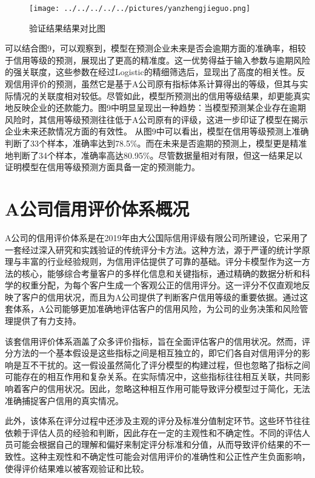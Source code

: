 \begin{figure}
	\centering
	\texttt{[image: ../../../../../pictures/yanzhengjieguo.png]}
	\caption{验证结果结果对比图}
\end{figure}
可以结合图9，可以观察到，模型在预测企业未来是否会逾期方面的准确率，相较于信用等级的预测，展现出了更高的精准度。这一优势得益于输入参数与逾期风险的强关联度，这些参数在经过Logistic的精细筛选后，显现出了高度的相关性。反观信用评价的预测，虽然它是基于A公司原有指标体系计算得出的等级，但其与实际情况的关联度相对较低。尽管如此，模型所预测出的信用等级结果，却更能真实地反映企业的还款能力。图9中明显呈现出一种趋势：当模型预测某企业存在逾期风险时，其信用等级预测往往低于A公司原有的评级，这进一步印证了模型在揭示企业未来还款情况方面的有效性。
从图9中可以看出，模型在信用等级预测上准确判断了33个样本，准确率达到78.5\%。而在未来是否逾期的预测上，模型更是精准地判断了34个样本，准确率高达80.95\%。尽管数据量相对有限，但这一结果足以证明模型在信用等级预测方面具备一定的预测能力。



\iffalse
\section{A公司信用评价体系概况}

A公司的信用评价体系是在2019年由大公国际信用评级有限公司所建设，它采用了一套经过深入研究和实践验证的传统评分卡方法。这种方法，源于严谨的统计学原理与丰富的行业经验规则，为信用评估提供了可靠的基础。评分卡模型作为这一方法的核心，能够综合考量客户的多样化信息和关键指标，通过精确的数据分析和科学的权重分配，为每个客户生成一个客观公正的信用评分。这一评分不仅直观地反映了客户的信用状况，而且为A公司提供了判断客户信用等级的重要依据。通过这套体系，A公司能够更加准确地评估客户的信用风险，为公司的业务决策和风险管理提供了有力支持。

该套信用评价体系涵盖了众多评价指标，旨在全面评估客户的信用状况。然而，评分方法的一个基本假设是这些指标之间是相互独立的，即它们各自对信用评分的影响是互不干扰的。这一假设虽然简化了评分模型的构建过程，但也忽略了指标之间可能存在的相互作用和复杂关系。在实际情况中，这些指标往往相互关联，共同影响着客户的信用状况。因此，忽略这种相互作用可能导致评分模型过于简化，无法准确捕捉客户信用的真实情况。

此外，该体系在评分过程中还涉及主观的评分及标准分值制定环节。这些环节往往依赖于评估人员的经验和判断，因此存在一定的主观性和不确定性。不同的评估人员可能会根据自己的理解和偏好来制定评分标准和分值，从而导致评价结果的不一致性。这种主观性和不确定性可能会对信用评价的准确性和公正性产生负面影响，使得评价结果难以被客观验证和比较。

